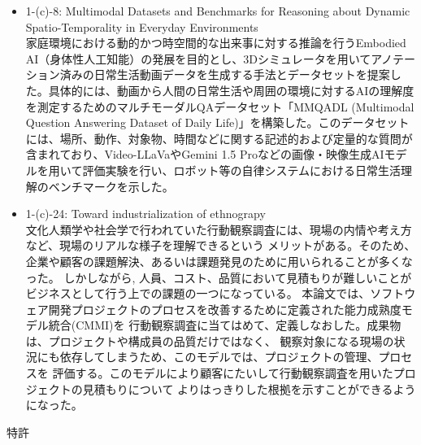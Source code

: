 \documentclass[dvipdfmx]{jlreq}
\begin{document}
\begin{itemize}
\item 1-(c)-8: Multimodal Datasets and Benchmarks for Reasoning about Dynamic Spatio-Temporality in Everyday Environments\\
家庭環境における動的かつ時空間的な出来事に対する推論を行うEmbodied AI（身体性人工知能）の発展を目的とし、3Dシミュレータを用いてアノテーション済みの日常生活動画データを生成する手法とデータセットを提案した。具体的には、動画から人間の日常生活や周囲の環境に対するAIの理解度を測定するためのマルチモーダルQAデータセット「MMQADL (Multimodal Question Answering Dataset of Daily Life)」を構築した。このデータセットには、場所、動作、対象物、時間などに関する記述的および定量的な質問が含まれており、Video-LLaVaやGemini 1.5 Proなどの画像・映像生成AIモデルを用いて評価実験を行い、ロボット等の自律システムにおける日常生活理解のベンチマークを示した。

\item 1-(c)-24: Toward industrialization of ethnograpy\\
文化人類学や社会学で行われていた行動観察調査には、現場の内情や考え方など、現場のリアルな様子を理解できるという
メリットがある。そのため、企業や顧客の課題解決、あるいは課題発見のために用いられることが多くなった。
しかしながら, 人員、コスト、品質において見積もりが難しいことがビジネスとして行う上での課題の一つになっている。
本論文では、ソフトウェア開発プロジェクトのプロセスを改善するために定義された能力成熟度モデル統合(CMMI)を
行動観察調査に当てはめて、定義しなおした。成果物は、プロジェクトや構成員の品質だけではなく、
観察対象になる現場の状況にも依存してしまうため、このモデルでは、プロジェクトの管理、プロセスを
評価する。このモデルにより顧客にたいして行動観察調査を用いたプロジェクトの見積もりについて
よりはっきりした根拠を示すことができるようになった。
\end{itemize}
\item 特許
\end{document}
